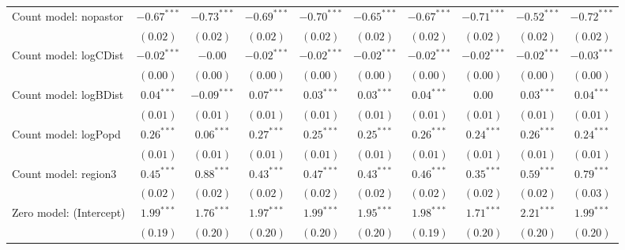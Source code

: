 \begin{sidewaystable}
\begin{center}
{\begin{tabular}{l c c c c c c c c c}
Count model: nopastor          & $-0.67^{***}$  & $-0.73^{***}$ & $-0.69^{***}$ & $-0.70^{***}$ & $-0.65^{***}$ & $-0.67^{***}$  & $-0.71^{***}$ & $-0.52^{***}$  & $-0.72^{***}$ \\
                               & $(0.02)$       & $(0.02)$      & $(0.02)$      & $(0.02)$      & $(0.02)$      & $(0.02)$       & $(0.02)$      & $(0.02)$       & $(0.02)$      \\
Count model: logCDist          & $-0.02^{***}$  & $-0.00$       & $-0.02^{***}$ & $-0.02^{***}$ & $-0.02^{***}$ & $-0.02^{***}$  & $-0.02^{***}$ & $-0.02^{***}$  & $-0.03^{***}$ \\
                               & $(0.00)$       & $(0.00)$      & $(0.00)$      & $(0.00)$      & $(0.00)$      & $(0.00)$       & $(0.00)$      & $(0.00)$       & $(0.00)$      \\
Count model: logBDist          & $0.04^{***}$   & $-0.09^{***}$ & $0.07^{***}$  & $0.03^{***}$  & $0.03^{***}$  & $0.04^{***}$   & $0.00$        & $0.03^{***}$   & $0.04^{***}$  \\
                               & $(0.01)$       & $(0.01)$      & $(0.01)$      & $(0.01)$      & $(0.01)$      & $(0.01)$       & $(0.01)$      & $(0.01)$       & $(0.01)$      \\
Count model: logPopd           & $0.26^{***}$   & $0.06^{***}$  & $0.27^{***}$  & $0.25^{***}$  & $0.25^{***}$  & $0.26^{***}$   & $0.24^{***}$  & $0.26^{***}$   & $0.24^{***}$  \\
                               & $(0.01)$       & $(0.01)$      & $(0.01)$      & $(0.01)$      & $(0.01)$      & $(0.01)$       & $(0.01)$      & $(0.01)$       & $(0.01)$      \\
Count model: region3           & $0.45^{***}$   & $0.88^{***}$  & $0.43^{***}$  & $0.47^{***}$  & $0.43^{***}$  & $0.46^{***}$   & $0.35^{***}$  & $0.59^{***}$   & $0.79^{***}$  \\
                               & $(0.02)$       & $(0.02)$      & $(0.02)$      & $(0.02)$      & $(0.02)$      & $(0.02)$       & $(0.02)$      & $(0.02)$       & $(0.03)$      \\
Zero model: (Intercept)        & $1.99^{***}$   & $1.76^{***}$  & $1.97^{***}$  & $1.99^{***}$  & $1.95^{***}$  & $1.98^{***}$   & $1.71^{***}$  & $2.21^{***}$   & $1.99^{***}$  \\
                               & $(0.19)$       & $(0.20)$      & $(0.20)$      & $(0.20)$      & $(0.20)$      & $(0.19)$       & $(0.20)$      & $(0.20)$       & $(0.20)$      \\

\end{tabular}}
\end{center}
\end{sidewaystable}
